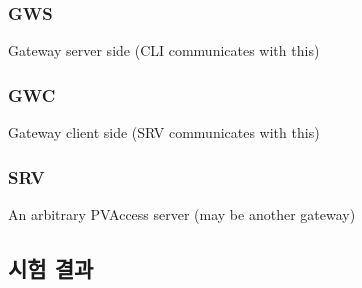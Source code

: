 \documentclass[11pt
  , a4paper
  , article
  , oneside
]{memoir}
\begin{document}
\subsubsection{GWS}
Gateway server side (CLI communicates with this)

\subsubsection{GWC}
Gateway client side (SRV communicates with this)

\subsubsection{SRV}
An arbitrary PVAccess server (may be another gateway)



\subsection{시험 결과}



















\clearpage


\end{document}
